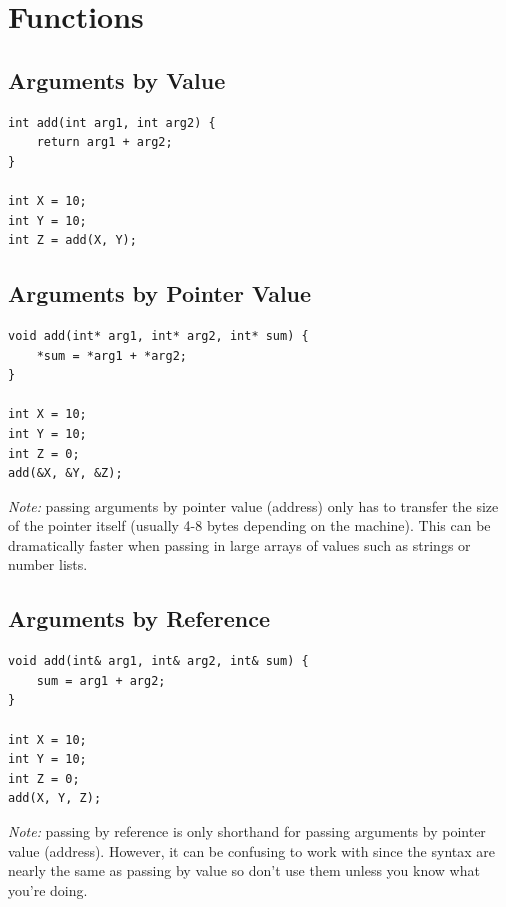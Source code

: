 \documentclass{article}
\begin{document}
\section{Functions}

\subsection{Arguments by Value}
\begin{lstlisting}
int add(int arg1, int arg2) {
	return arg1 + arg2;
}

int X = 10;
int Y = 10;
int Z = add(X, Y);
\end{lstlisting}

\subsection{Arguments by Pointer Value}
\begin{lstlisting}
void add(int* arg1, int* arg2, int* sum) {
	*sum = *arg1 + *arg2;
}

int X = 10;
int Y = 10;
int Z = 0;
add(&X, &Y, &Z);
\end{lstlisting}
\emph{Note:} passing arguments by pointer value (address) only has to transfer the size of the pointer itself (usually 4-8 bytes depending on the machine). This can be dramatically faster when passing in large arrays of values such as strings or number lists. 

\subsection{Arguments by Reference}
\begin{lstlisting}
void add(int& arg1, int& arg2, int& sum) {
	sum = arg1 + arg2;
}

int X = 10;
int Y = 10;
int Z = 0;
add(X, Y, Z);
\end{lstlisting}

\emph{Note:} passing by reference is only shorthand for passing arguments by pointer value (address). However, it can be confusing to work with since the syntax are nearly the same as passing by value so don't use them unless you know what you're doing.
	
\end{document}
